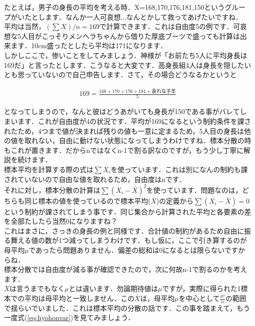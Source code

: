 \documentclass[11pt,a4paper,uplatex]{ujreport} 	%
\begin{document}
たとえば，男子の身長の平均を考える時．X={168,170,176,181,150}というグループがいたとします．なんか一人可哀想...なんとかして救ってあげたいですね．\\

平均は当然，$(\sum X) /n　= 169$で計算できます．これは自由度5の例です．可哀想な5人目がこっそりメンヘラちゃんから借りた厚底ブーツで盛っても計算は出来ます．10cm盛ったとしたら平均は171になります．\\

しかしここで，惨いことをしてみましょう．神様が「お前たち5人に平均身長は169だ」と言ったとします．こうなると大変です．高身長組4人は身長を隠したいとも思っていないので自己申告します．さて，その場合どうなるかというと

\begin{align}
  169 = \frac{168+170+176+181+\text{哀れな子羊}}{5}
\end{align}

となってしまうので，なんと彼はどうあがいても身長が150である事がバレてしまいます．これが自由度が4の状況です．平均が169になるという制約条件を課されたため，4つまで値が決まれば残りの値も一意に定まるため，5人目の身長は他の値を取れない，自由に動けない状態になってしまうわけですね．標本分散の時もこれが置きます．だからnではなくn-1で割る訳なのですが，もう少し丁寧に解説を続けます．\\

標本平均を計算する際の式は$\sum X_i$を使っています．これは別になんの制約も課されていないので自由な値を取れるため，自由度はnです．\\

それに対し，標本分散の計算は$\sum (X_i -\bar{X})^2$を使っています．問題なのは，どちらも同じ標本の値を使っているので標本平均($\bar{X}$)の定義から$\sum (X_i - \bar{X}) = 0$という制約が課されてしまう事です．同じ集合から計算された平均と各要素の差を全部たしたら当然0になりますね？\\

これはまさに，さっきの身長の例と同様です．合計値の制約があるため自由に振る舞える値の数が1つ減ってしまうわけです．もし仮に，ここで引き算するのが母平均$\mu$であったら問題ありません．偏差の総和は0になるとは限らないですからね．\\

標本分散では自由度が減る事が確認できたので，次に何故n-1で割るのかを考えます．\\

$\bar{X}$は言うまでもなく$\mu$とは違います．勿論期待値は$\mu$ですが，実際に得られた1標本での平均は母平均と一致しません．この$\bar{X}$は，母平均$\mu$を中心として$\frac{\sigma^2}{n}$の範囲で揺らいでいました．これは標本平均の分散の話です．この事を踏まえて，もう一度式(\ref{eq:hyohonvar})を見てみましょう．
\end{document}
